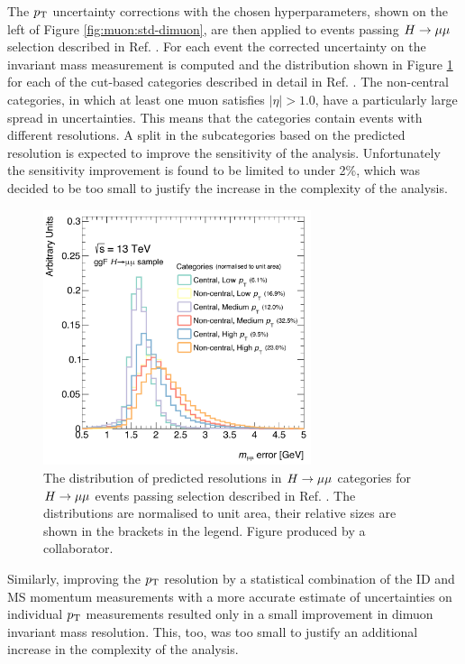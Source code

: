The $p_{\text{T}}$ uncertainty corrections with the chosen hyperparameters,
shown on the left of Figure \ref{fig:muon:std-dimuon}, are then applied
to events passing $\hmumu$ selection described in Ref.
\cite{ATLAS-CONF-2018-026}. For each event the corrected uncertainty
on the invariant mass measurement is computed and the distribution
shown in Figure \ref{fig:muon:hmumu} for each of the cut-based categories
described in detail in Ref. \cite{ATLAS-CONF-2018-026}. The non-central
categories, in which at least one muon satisfies
$|\eta| > 1.0$, have a particularly large spread in uncertainties. This means
that the categories contain events with different resolutions. A split in
the subcategories based on the predicted resolution is expected to
improve the sensitivity of the analysis. Unfortunately the sensitivity
improvement is found to be limited to under 2\%, which was decided
to be too small to justify the increase in the complexity of the analysis.
\begin{figure}[h!]
  \centering
  \includegraphics[width=0.7\textwidth]{figures/muons/vader-hmumu}
  \caption[Distribution of predicted resolutions in $\hmumu$ categories]
  {The distribution of predicted resolutions in $\hmumu$ categories for
  \ggf~$\hmumu$ events passing selection described in Ref.
  \cite{ATLAS-CONF-2018-026}. The distributions are normalised
  to unit area, their relative sizes are shown in the brackets in
  the legend. Figure produced by a collaborator.
  }
  \label{fig:muon:hmumu}
\end{figure}

Similarly, improving the $p_{\text{T}}$ resolution by a statistical combination
of the ID and MS momentum measurements with a more accurate estimate
of uncertainties on individual $p_{\text{T}}$ measurements resulted only in a small
improvement in dimuon invariant mass resolution. This, too, was too small
to justify an additional increase in the complexity of the analysis.





